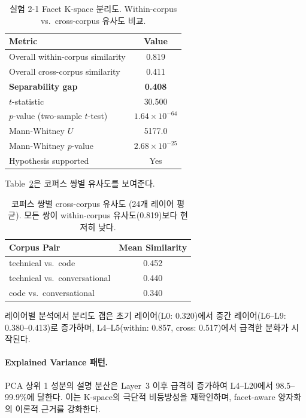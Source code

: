 \documentclass[11pt,a4paper]{article}
\begin{document}
\begin{table}[H]
\centering
\caption{실험 2-1 Facet K-space 분리도. Within-corpus vs.\ cross-corpus 유사도 비교.}
\label{tab:sep}
\begin{tabular}{lc}
\toprule
\textbf{Metric} & \textbf{Value} \\
\midrule
Overall within-corpus similarity & 0.819 \\
Overall cross-corpus similarity & 0.411 \\
\textbf{Separability gap} & \textbf{0.408} \\
$t$-statistic & 30.500 \\
$p$-value (two-sample $t$-test) & $1.64 \times 10^{-64}$ \\
Mann-Whitney $U$ & 5177.0 \\
Mann-Whitney $p$-value & $2.68 \times 10^{-25}$ \\
Hypothesis supported & \textcolor{success}{Yes} \\
\bottomrule
\end{tabular}
\end{table}

Table~\ref{tab:pair_sim}은 코퍼스 쌍별 유사도를 보여준다.

\begin{table}[H]
\centering
\caption{코퍼스 쌍별 cross-corpus 유사도 (24개 레이어 평균). 모든 쌍이 within-corpus 유사도(0.819)보다 현저히 낮다.}
\label{tab:pair_sim}
\begin{tabular}{lc}
\toprule
\textbf{Corpus Pair} & \textbf{Mean Similarity} \\
\midrule
technical vs.\ code & 0.452 \\
technical vs.\ conversational & 0.440 \\
code vs.\ conversational & 0.340 \\
\bottomrule
\end{tabular}
\end{table}

레이어별 분석에서 분리도 갭은 초기 레이어(L0: 0.320)에서 중간 레이어(L6--L9: 0.380--0.413)로 증가하며, L4--L5(within: 0.857, cross: 0.517)에서 급격한 분화가 시작된다.

\paragraph{Explained Variance 패턴.}
PCA 상위 1 성분의 설명 분산은 Layer~3 이후 급격히 증가하여 L4--L20에서 98.5--99.9\%에 달한다.
이는 K-space의 극단적 비등방성을 재확인하며, facet-aware 양자화의 이론적 근거를 강화한다.
\end{document}
